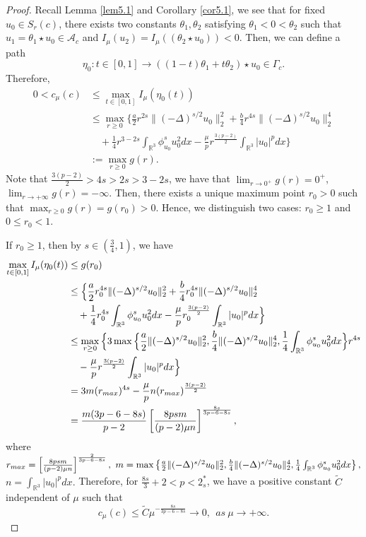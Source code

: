 \documentclass[11pt]{article}
\numberwithin{equation}{section}
\begin{document}
\begin{proof} 
Recall Lemma {\ref{lem5.1}} and Corollary {\ref{cor5.1}}, we see that for fixed 
$u_0\in S_{r}(c)$, there exists two constants
$\theta_1, \theta_2$ satisfying $\theta_1<0< \theta_2$ such that 
$u_1=\theta_1 \star u_0 \in \mathcal{A}_c$ and 
$I_\mu(u_2)=I_\mu((\theta_2 \star u_0 ))<0$. Then, we can define a path
$$
\eta_0: t \in [0,1]\to ((1-t)\theta_1+t \theta_2)\star u_0 \in \Gamma_c.
$$
Therefore,
\begin{align*}
0<c_\mu(c)
&\leq  \max_{t\in[0,1]} I_\mu(\eta_0(t))\\
&\leq  \max_{r\geq 0} \Big\{\frac{a}{2}r^{2s}\|(-\Delta)^{s/2}u_0\|^2_2+\frac{b}{4}r^{4s}\|(-\Delta)^{s/2}u_0\|^4_2\\
&\quad +\frac{1}{4}r^{3-2s}\int_{\mathbb{R}^3}\phi^s_{u_0}u^2_0dx
 -\frac{\mu}{p}r^{\frac{3(p-2)}{2}}\int_{\mathbb{R}^3}|u_0|^pdx\Big\}\\
&:=\max_{r\geq 0}g(r).
\end{align*}
Note that $\frac{3(p-2)}{2}>4s>2s>3-2s$, we have that $\lim_{r\to 0^+}g(r)=0^+$, 
$\lim_{r\to +\infty}g(r)=-\infty$. Then, there exists a unique maximum point $r_0>0$ 
such that $\max_{r\geq 0}g(r)=g(r_0)>0$. Hence, we distinguish two cases: $r_0\geq1$ 
and $0 \leq r_0<1$.

If $r_0\geq1$, then by $s\in(\frac{3}{4}, 1)$, we have
\begin{align*}
\max_{t\in[0,1]} I_\mu(\eta_0(t))&\leq  g(r_0)\\
&\leq  \Big\{\frac{a}{2}r^{4s}_0\|(-\Delta)^{s/2}u_0\|^2_2
 +\frac{b}{4}r^{4s}_0\|(-\Delta)^{s/2}u_0\|^4_2\\
&\quad +\frac{1}{4}r^{4s}_0\int_{\mathbb{R}^3}\phi^s_{u_0}u^2_0dx
 -\frac{\mu}{p}r^{\frac{3(p-2)}{2}}_0\int_{\mathbb{R}^3}|u_0|^pdx\Big\}\\
&\leq  \max_{r\geq 0}\Big\{3\max\Big\{\frac{a}{2}\|(-\Delta)^{s/2}u_0\|^2_2, 
 \frac{b}{4}\|(-\Delta)^{s/2}u_0\|^4_2,
 \frac{1}{4}\int_{\mathbb{R}^3}\phi^s_{u_0}u^2_0dx  \Big\}r^{4s}\\
&\quad -\frac{\mu}{p}r^{\frac{3(p-2)}{2}}\int_{\mathbb{R}^3}|u_0|^pdx\Big\}\\
&= 3m(r_{\rm max})^{4s}-\frac{\mu}{p}n(r_{\rm max})^{\frac{3(p-2)}{2}}\\
&= \frac{m(3p-6-8s)}{p-2}\left[\frac{8psm}{(p-2)\mu n}\right]^{\frac{8s}{3p-6-8s}},
\end{align*}
where $r_{\rm max}=\left[\frac{8psm}{(p-2)\mu n}\right]^{\frac{2}{3p-6-8s}}, 
~m=\max\left\{\frac{a}{2}\|(-\Delta)^{s/2}u_0\|^2_2, \frac{b}{4}\|(-\Delta)^{s/2}u_0\|^4_2,
\frac{1}{4}\int_{\mathbb{R}^3}\phi^s_{u_0}u^2_0dx  \right\},$ $n=\int_{\mathbb{R}^3}|u_0|^pdx.$
Therefore, for $\frac{8s}{3}+2<p<2^*_s$, we have a positive constant $\tilde{C}$ independent of $\mu$ such that
$$c_\mu (c)\leq \tilde{C}{\mu}^{-\frac{8s}{3p-6-8s}}\to 0, ~~as~\mu\to +\infty.$$



\end{proof}
\end{document}
